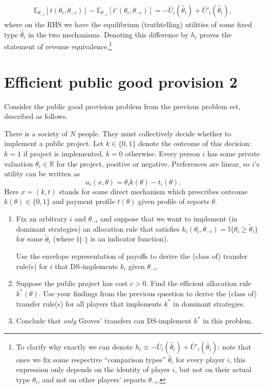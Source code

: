 \documentclass[a4paper]{article}
\begin{document}
	\begin{align*}
		\mathbb{E}_{\theta_{-i}}\left[ t(\theta_i,\theta_{-i}) \right] - \mathbb{E}_{\theta_{-i}}\left[ t'(\theta_i,\theta_{-i}) \right]
		=
		-\bar{U}_i(\hat{\theta}_i) + \bar{U}'_i(\hat{\theta}_i),
	\end{align*}
	where on the RHS we have the equilibrium (truthtelling) utilities of some fixed type $\hat{\theta}_i$ in the two mechanisms. Denoting this difference by $h_i$ proves the statement of revenue equivalence.\footnote{To clarify why exactly we can denote $h_i \equiv -\bar{U}_i(\hat{\theta}_i) + \bar{U}'_i(\hat{\theta}_i)$: note that once we fix some respective ``comparison types'' $\hat{\theta}_i$ for every player $i$, this expression only depends on the identity of player $i$, but not on their actual type $\theta_i$, and not on other players' reports $\theta_{-i}$.}
\fi


\section{Efficient public good provision 2}

	Consider the public good provision problem from the previous problem set, described as follows.
	
	There is a society of $N$ people. They must collectively decide whether to implement a public project. Let $k \in \{0,1\}$ denote the outcome of this decision: $k=1$ if project is implemented, $k=0$ otherwise. Every person $i$ has some private valuation $\theta_i \in \mathbb{R}$ for the project, positive or negative. Preferences are linear, so $i$'s utility can be written as
	$$
		u_i(x,\theta) = \theta_i k(\theta) - t_i(\theta).
	$$
	Here $x=(k,t)$ stands for some direct mechanism which prescribes outcome $k(\theta) \in \{0,1\}$ and payment profile $t(\theta)$ given profile of reports $\theta$.
	
	\begin{enumerate}
		\item Fix an arbitrary $i$ and $\theta_{-i}$ and suppose that we want to implement (in dominant strategies) an allocation rule that satisfies $k_i(\theta_i, \theta_{-i}) = \mathbb{I}\{\theta_i \geq \tilde{\theta}_i \}$ for some $\tilde{\theta}_i$ (where $\mathbb{I}\{\cdot\}$ is an indicator function).
		
		Use the envelope representation of payoffs to derive the (class of) transfer rule(s) for $i$ that DS-implements $k_i$ given $\theta_{-i}$.
		
		\item Suppose the public project has cost $c > 0$. Find the efficient allocation rule $k^*(\theta)$. Use your findings from the previous question to derive the (class of) transfer rule(s) for all players that implements $k^*$ in dominant strategies.
		
		\item Conclude that \emph{only} Groves' transfers can DS-implement $k^*$ in this problem.
	\end{enumerate}
\end{document}

